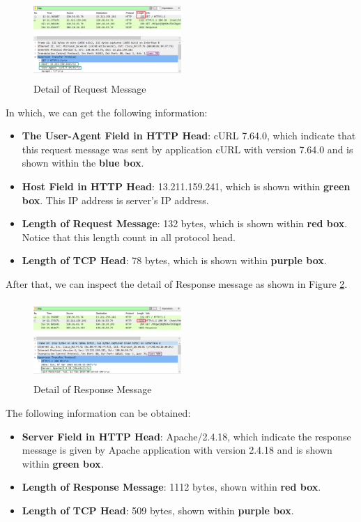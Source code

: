 \documentclass[10pt,a4paper]{article}
\begin{document}
\begin{figure}[H]
	\center
	\includegraphics[width = 0.5\textwidth, height = 3cm]{http_req_det}
	\caption{Detail of Request Message}
	\label{http_req_det}
\end{figure}
In which, we can get the following information:
\begin{itemize}
	\item \textbf{The User-Agent Field in HTTP Head}: cURL 7.64.0, which indicate that this request message was sent by application cURL with version 7.64.0 and is shown within the \textbf{blue box}.
	\item \textbf{Host Field in HTTP Head}: 13.211.159.241, which is shown within \textbf{green box}. This IP address is server's IP address.
	\item \textbf{Length of Request Message}: 132 bytes, which is shown within \textbf{red box}. Notice that this length count in all protocol head.
	\item  \textbf{Length of TCP Head}: 78 bytes, which is shown within \textbf{purple box}.
\end{itemize}
After that, we can inspect the detail of Response message as shown in Figure \ref{http_res_det}.
\begin{figure}[H]
	\center
	\includegraphics[width = 0.5\textwidth, height = 3cm]{http_res_det}
	\caption{Detail of Response Message}
	\label{http_res_det}
\end{figure}
The following information can be obtained:
\begin{itemize}
	\item \textbf{Server Field in HTTP Head}: Apache/2.4.18, which indicate the response message is given by Apache application with version 2.4.18 and is shown within \textbf{green box}.
	\item \textbf{Length of Response Message}: 1112 bytes, shown within \textbf{red box}.
	\item \textbf{Length of TCP Head}: 509 bytes, shown within \textbf{purple box}.
\end{itemize}
\end{document}
